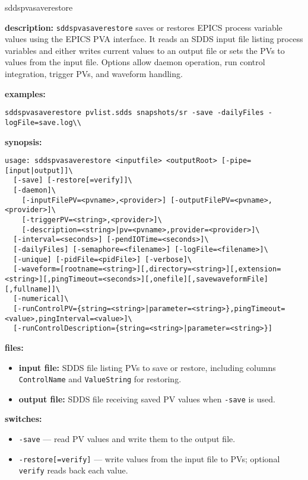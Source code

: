 \begin{sddsprog}{sddspvasaverestore}
\item \textbf{description:}
  \verb+sddspvasaverestore+ saves or restores EPICS process variable values using the EPICS PVA
  interface. It reads an SDDS input file listing process variables and either writes current
  values to an output file or sets the PVs to values from the input file. Options allow daemon
  operation, run control integration, trigger PVs, and waveform handling.
\item \textbf{examples:}
\begin{verbatim}
sddspvasaverestore pvlist.sdds snapshots/sr -save -dailyFiles -logFile=save.log\\
\end{verbatim}
\item \textbf{synopsis:}
\begin{verbatim}
usage: sddspvasaverestore <inputfile> <outputRoot> [-pipe=[input|output]]\
  [-save] [-restore[=verify]]\
  [-daemon]\
    [-inputFilePV=<pvname>,<provider>] [-outputFilePV=<pvname>,<provider>]\
    [-triggerPV=<string>,<provider>]\
    [-description=<string>|pv=<pvname>,provider=<provider>]\
  [-interval=<seconds>] [-pendIOTime=<seconds>]\
  [-dailyFiles] [-semaphore=<filename>] [-logFile=<filename>]\
  [-unique] [-pidFile=<pidFile>] [-verbose]\
  [-waveform=[rootname=<string>][,directory=<string>][,extension=<string>][,pingTimeout=<seconds>][,onefile][,savewaveformFile][,fullname]]\
  [-numerical]\
  [-runControlPV={string=<string>|parameter=<string>},pingTimeout=<value>,pingInterval=<value>]\
  [-runControlDescription={string=<string>|parameter=<string>}]
\end{verbatim}
\item \textbf{files:}
\begin{itemize}
  \item \textbf{input file:} SDDS file listing PVs to save or restore, including columns \verb|ControlName| and \verb|ValueString| for restoring.
  \item \textbf{output file:} SDDS file receiving saved PV values when \texttt{-save} is used.
\end{itemize}
\item \textbf{switches:}
\begin{itemize}
  \item {\tt -save} --- read PV values and write them to the output file.
  \item {\tt -restore[=verify]} --- write values from the input file to PVs; optional {\tt verify} reads back each value.

\end{itemize}
\end{sddsprog}
